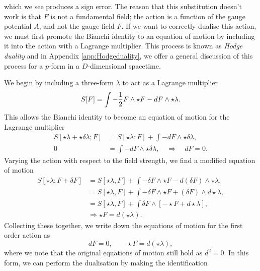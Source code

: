 which we see produces a sign error. The reason that this substitution doesn't work is that $F$ is not a fundamental field; the action  is a function of the gauge potential $A$, and not the gauge field $F$. If we want to correctly dualise this action, we must first promote the Bianchi identity to an equation of motion by including it into the action with a Lagrange multiplier. This process is known as \emph{Hodge duality} and in Appendix \ref{app:Hodgeduality}, we offer a general discussion of this process for a $p$-form in a $D$-dimensional spacetime.

We begin by including a three-form $\lambda$ to act as a Lagrange multiplier
\begin{equation}
\label{eq:firstorder}
S[F] = \int -\frac{1}{2} F \wedge \star F - d F \wedge \star \lambda.
\end{equation}
This allows the Bianchi identity to become an equation of motion for the Lagrange multiplier
\begin{equation*}
\begin{aligned}
S[ \star \lambda + \star \delta \lambda; F] &= S[ \star \lambda; F] + \int - dF \wedge \star \delta \lambda, \\
0 &= \int - dF \wedge \star \delta \lambda, \quad \Rightarrow \quad dF = 0.
\end{aligned}
\end{equation*}
Varying the action with respect to the field strength, we find a modified equation of motion
\begin{equation*}
\begin{aligned}
		S[ \star \lambda; F + \delta F] &= S[\star \lambda, F] + \int - \delta F \wedge \star  F - d(\delta F)\wedge \star \lambda, \\
		&= S[\star \lambda, F] + \int - \delta F \wedge \star  F + (\delta F)\wedge d \star \lambda, \\
		&= S[\star \lambda, F] + \int \delta F  \wedge \left[ - \star  F + d \star \lambda \right], \\
		&\Rightarrow \star F = d(\star \lambda).
\end{aligned}
\end{equation*}
Collecting these together, we write down the equations of motion for the first order action as
\begin{equation*}
	dF = 0, \qquad \star F = d(\star \lambda), 
\end{equation*}
where we note that the original equations of motion still hold as $d^2 = 0$. In this form, we can perform the dualisation by making the identification
